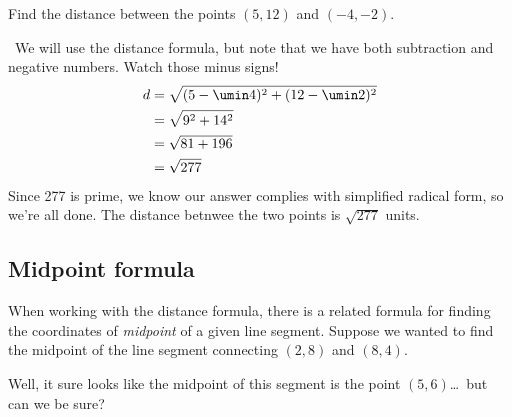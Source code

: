 \begin{boxex}
Find the distance between the points $(5, 12)$ and $(-4, -2)$.

\exsoln\ We will use the distance formula, but note that we have both subtraction and negative numbers. Watch those minus signs!
\[\begin{aligned}
d &= \sqrt{ (5 - \umin4)^2 + (12 - \umin2)^2 } \\
&= \sqrt{ 9^2 + 14^2 } \\
&=\sqrt{ 81 + 196 } \\
&=\sqrt{ 277 }
\end{aligned}\]
Since 277 is prime, we know our answer complies with simplified radical form, so we're all done. The distance betnwee the two points is $\sqrt{277}$ units.
\end{boxex}

\subsection{Midpoint formula}

When working with the distance formula, there is a related formula for finding the coordinates of \textit{midpoint} of a given line segment. Suppose we wanted to find the midpoint of the line segment connecting $(2,8)$ and $(8,4)$.
\begin{center}
\end{center}
Well, it sure looks like the midpoint of this segment is the point $(5,6)$\ldots\ but can we be sure?

